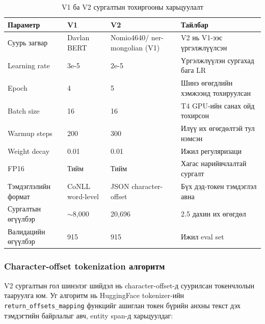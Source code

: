 \begin{table}[h!]
\centering
\renewcommand{\arraystretch}{1.4}
\small
\begin{tabular}{|p{3cm}|p{2.8cm}|p{3.5cm}|p{4.5cm}|}
\hline
\textbf{Параметр} & \textbf{V1} & \textbf{V2} & \textbf{Тайлбар} \\ \hline
Суурь загвар & Davlan BERT & Nomio4640/ ner-mongolian (V1) & V2 нь V1-ээс үргэлжлүүлсэн \\ \hline
Learning rate & 3e-5 & 2e-5 & Үргэлжлүүлэн сургахад бага LR \\ \hline
Epoch & 4 & 5 & Шинэ өгөгдлийн хэмжээнд тохируулсан \\ \hline
Batch size & 16 & 16 & T4 GPU-ийн санах ойд тохирсон \\ \hline
Warmup steps & 200 & 300 & Илүү их өгөгдөлтэй тул нэмсэн \\ \hline
Weight decay & 0.01 & 0.01 & Ижил регуляризаци \\ \hline
FP16 & Тийм & Тийм & Хагас нарийвчлалтай сургалт \\ \hline
Тэмдэглэлийн формат & CoNLL word-level & JSON character-offset & Бүх дэд-токен тэмдэглэл авна \\ \hline
Сургалтын өгүүлбэр & $\sim$8,000 & 20,696 & 2.5 дахин их өгөгдөл \\ \hline
Валидацийн өгүүлбэр & 915 & 915 & Ижил eval set \\ \hline
\end{tabular}
\normalsize
\caption{V1 ба V2 сургалтын тохиргооны харьцуулалт}
\label{tab:v1_v2_config}
\end{table}

\subsubsection{Character-offset tokenization алгоритм}

V2 сургалтын гол шинэлэг шийдэл нь character-offset-д суурилсан токенчлолын тааруулга юм. Уг алгоритм нь HuggingFace tokenizer-ийн \texttt{return\_offsets\_mapping} функцийг ашиглан токен бүрийн анхны текст дэх тэмдэгтийн байрлалыг авч, entity span-д харьцуулдаг:

